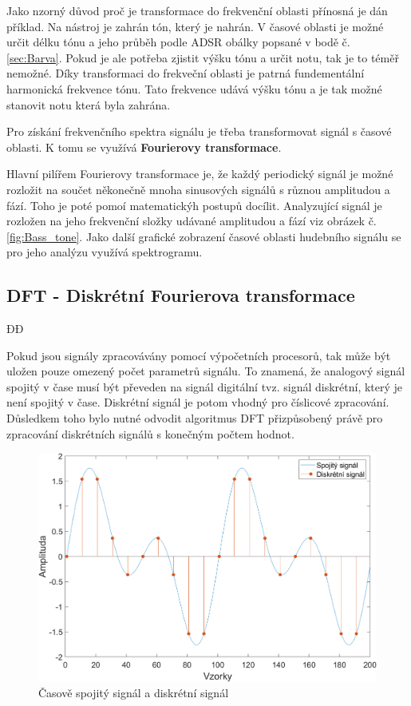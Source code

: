  Jako nzorný důvod proč je transformace do frekvenční oblasti přínosná je dán příklad. Na nástroj je zahrán tón, který je nahrán. 
  V časové oblasti je možné určit délku tónu a jeho průběh podle ADSR obálky popsané v bodě č. \ref*{sec:Barva}.
  Pokud je ale potřeba zjistit výšku tónu a určit notu, tak je to téměř nemožné.
  Díky transformaci do frekveční oblasti je patrná fundementální harmonická frekvence tónu.
  Tato frekvence udává výšku tónu a je tak možné stanovit notu která byla zahrána.

  Pro získání frekvenčního spektra signálu je třeba transformovat signál s časové oblasti.
  K tomu se využívá \textbf{Fourierovy transformace}. 

  Hlavní pilířem Fourierovy transformace je, že každý periodický signál je možné rozložit na součet někonečně mnoha sinusových signálů s různou amplitudou a fází.
  Toho je poté pomoí matematickýh postupů docílit.
  Analyzující signál je rozložen na jeho frekvenční složky udávané amplitudou a fází viz obrázek č.\ref*{fig:Bass_tone}.
  Jako další grafické zobrazení časové oblasti hudebního signálu se pro jeho analýzu využívá spektrogramu.


  \subsection{DFT - Diskrétní Fourierova transformace}ĐĐ

  Pokud jsou signály zpracovávány pomocí výpočetních procesorů,
  tak může být uložen pouze omezený počet parametrů signálu.
  To znamená, že analogový signál spojitý v čase musí být převeden na signál digitální tvz. signál diskrétní, který je není spojitý v čase. 
  Diskrétní signál je potom vhodný pro číslicové zpracování.
  Důsledkem toho bylo nutné odvodit algoritmus \acs{DFT} přizpůsobený právě pro zpracování diskrétních signálů s konečným počtem hodnot.

  \begin{figure}[H]
    \centering
    \includegraphics[width = 0.8\linewidth]{obrazky/Discrete_signal.png}
    \caption{Časově spojitý signál a diskrétní signál}
    \label{fig:Discrete_signal}
  \end{figure}


